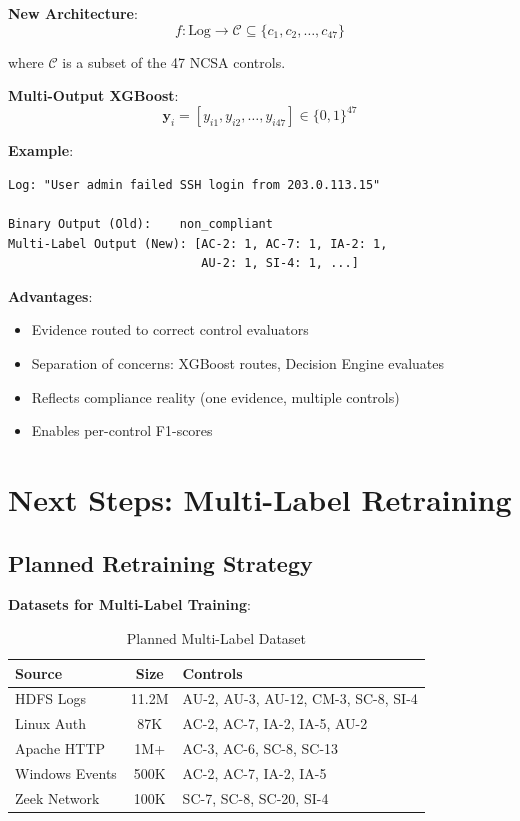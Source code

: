 \documentclass[11pt,conference]{IEEEtran}
\begin{document}
\textbf{New Architecture}:
\begin{equation}
f: \text{Log} \rightarrow \mathcal{C} \subseteq \{c_1, c_2, \ldots, c_{47}\}
\end{equation}

where $\mathcal{C}$ is a subset of the 47 NCSA controls.

\textbf{Multi-Output XGBoost}:
\begin{equation}
\mathbf{y}_i = [y_{i1}, y_{i2}, \ldots, y_{i47}] \in \{0,1\}^{47}
\end{equation}

\textbf{Example}:
\begin{verbatim}
Log: "User admin failed SSH login from 203.0.113.15"

Binary Output (Old):    non_compliant
Multi-Label Output (New): [AC-2: 1, AC-7: 1, IA-2: 1,
                           AU-2: 1, SI-4: 1, ...]
\end{verbatim}

\textbf{Advantages}:
\begin{itemize}
    \item Evidence routed to correct control evaluators
    \item Separation of concerns: XGBoost routes, Decision Engine evaluates
    \item Reflects compliance reality (one evidence, multiple controls)
    \item Enables per-control F1-scores
\end{itemize}

\section{Next Steps: Multi-Label Retraining}

\subsection{Planned Retraining Strategy}

\textbf{Datasets for Multi-Label Training}:
\begin{table}[h]
\centering
\caption{Planned Multi-Label Dataset}
\begin{tabular}{|l|c|l|}
\hline
\textbf{Source} & \textbf{Size} & \textbf{Controls} \\
\hline
HDFS Logs & 11.2M & AU-2, AU-3, AU-12, CM-3, SC-8, SI-4 \\
\hline
Linux Auth & 87K & AC-2, AC-7, IA-2, IA-5, AU-2 \\
\hline
Apache HTTP & 1M+ & AC-3, AC-6, SC-8, SC-13 \\
\hline
Windows Events & 500K & AC-2, AC-7, IA-2, IA-5 \\
\hline
Zeek Network & 100K & SC-7, SC-8, SC-20, SI-4 \\
\hline
\end{tabular}
\end{table}
\end{document}
